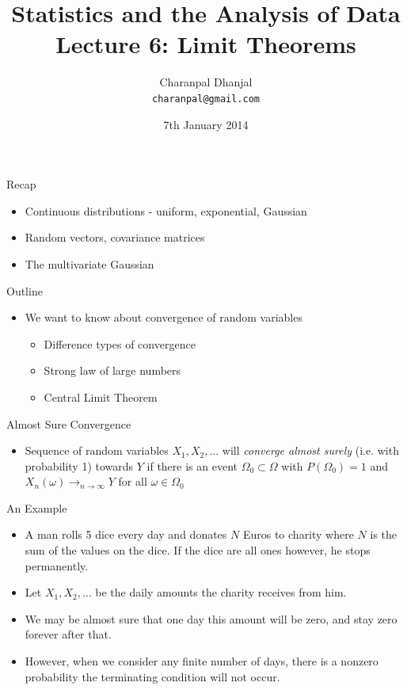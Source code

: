 \documentclass{beamer}
\title{Statistics and the Analysis of Data\\ Lecture 6: Limit Theorems}
\author{Charanpal Dhanjal \\ \texttt{charanpal@gmail.com}}
\institute{\'{E}cole des Ponts}
\date{7th January 2014}
\begin{document}
\frame{\titlepage}


\begin{frame}{Recap}  
\begin{itemize} 
\item Continuous distributions - uniform, exponential, Gaussian 
\item Random vectors, covariance matrices 
\item The multivariate Gaussian 
\end{itemize}
\end{frame}

\begin{frame}{Outline}  
\begin{itemize} 
 \item We want to know about convergence of random variables 
\begin{itemize}
\item Difference types of convergence 
\item Strong law of large numbers 
\item Central Limit Theorem 
\end{itemize}
\end{itemize}
\end{frame}

\begin{frame}{Almost Sure Convergence}  
\begin{itemize}
 \item Sequence of random variables $X_1, X_2, \ldots$ will \emph{converge almost surely} (i.e. with probability 1) towards $Y$ if there is an event $\Omega_0 \subset \Omega$ with $P(\Omega_0) = 1$ and $X_n(\omega) \rightarrow_{n \rightarrow \infty} Y$ for all $\omega \in \Omega_0$
\end{itemize}
\end{frame}

\begin{frame}{An Example} 
\begin{itemize}
 \item A man rolls 5 dice every day and donates $N$ Euros to charity where $N$ is the sum of the values on the dice. If the dice are all ones however, he stops permanently.  
 \item Let $X_1, X_2, \ldots$ be the daily amounts the charity receives from him.
 \item We may be almost sure that one day this amount will be zero, and stay zero forever after that.
 \item However, when we consider any finite number of days, there is a nonzero probability the terminating condition will not occur. 
\end{itemize}
\end{frame}
\end{document}

